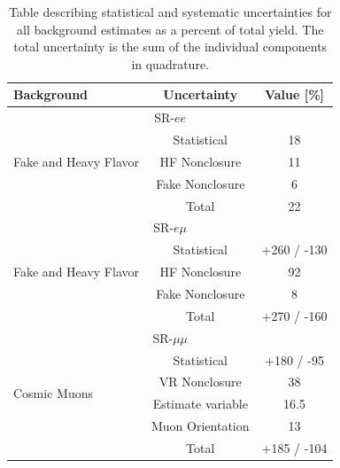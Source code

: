 \begin{table}[htb]
\small
\begin{center}
\begin{tabular}{lcc}
Background & Uncertainty & Value [\%] \\
\hline
\multicolumn{3}{c}{SR-$ee$} \\
\hline
\multirow{3}{*}{Fake and Heavy Flavor} 	& Statistical 	& 18 \\
 						& HF Nonclosure & 11 \\
 						& Fake Nonclosure& 6 \\
 						& Total 		& 22 \\
\hline
\multicolumn{3}{c}{SR-$e\mu$} \\
\hline
\multirow{3}{*}{Fake and Heavy Flavor} 	& Statistical 	& +260 / -130 \\
 						& HF Nonclosure & 92 \\ 
 						& Fake Nonclosure & 8 \\
 						& Total 		& +270 / -160 \\
\hline
\multicolumn{3}{c}{SR-$\mu\mu$} \\
\hline
\multirow{4}{*}{Cosmic Muons} 	& Statistical 			& +180 / -95 \\
 								& VR Nonclosure		& 38 \\
 								& Estimate variable		& 16.5 \\
 								& Muon Orientation      & 13  \\
 								& Total 				& +185 / -104 \\
\hline
\end{tabular}
\caption{Table describing statistical and systematic uncertainties for all background estimates as a percent of total yield. The total uncertainty is the sum of the individual components in quadrature.
}
\label{tab:uncertainties}
\end{center}
\end{table}






